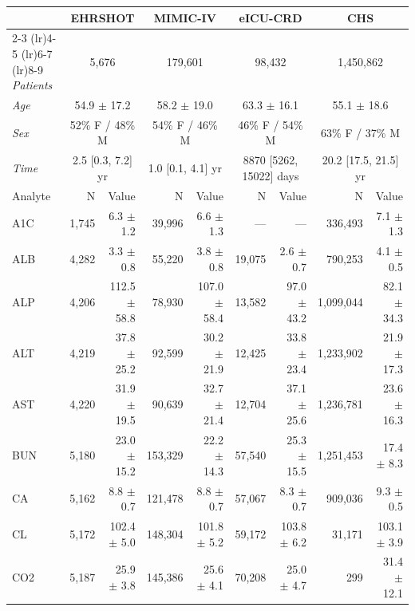 \begin{table}[ht]
\centering
\footnotesize
\begin{tabular}{lrrrrrrrr}
\toprule
  & \multicolumn{2}{c}{EHRSHOT} & \multicolumn{2}{c}{MIMIC-IV} & \multicolumn{2}{c}{eICU-CRD} & \multicolumn{2}{c}{CHS} \\
\cmidrule(lr){2-3} \cmidrule(lr){4-5} \cmidrule(lr){6-7} \cmidrule(lr){8-9}
\textit{Patients} & \multicolumn{2}{c}{5,676} & \multicolumn{2}{c}{179,601} & \multicolumn{2}{c}{98,432} & \multicolumn{2}{c}{1,450,862} \\
\textit{Age} & \multicolumn{2}{c}{54.9 $\pm$ 17.2} & \multicolumn{2}{c}{58.2 $\pm$ 19.0} & \multicolumn{2}{c}{63.3 $\pm$ 16.1} & \multicolumn{2}{c}{55.1 $\pm$ 18.6} \\
\textit{Sex} & \multicolumn{2}{c}{52\% F / 48\% M} & \multicolumn{2}{c}{54\% F / 46\% M} & \multicolumn{2}{c}{46\% F / 54\% M} & \multicolumn{2}{c}{63\% F / 37\% M} \\
\textit{Time} & \multicolumn{2}{c}{2.5 [0.3, 7.2] yr} & \multicolumn{2}{c}{1.0 [0.1, 4.1] yr} & \multicolumn{2}{c}{8870 [5262, 15022] days} & \multicolumn{2}{c}{20.2 [17.5, 21.5] yr} \\
\midrule
Analyte & N & Value & N & Value & N & Value & N & Value \\
\midrule
A1C & 1,745 & 6.3 $\pm$ 1.2 & 39,996 & 6.6 $\pm$ 1.3 & --- & --- & 336,493 & 7.1 $\pm$ 1.3 \\
ALB & 4,282 & 3.3 $\pm$ 0.8 & 55,220 & 3.8 $\pm$ 0.8 & 19,075 & 2.6 $\pm$ 0.7 & 790,253 & 4.1 $\pm$ 0.5 \\
ALP & 4,206 & 112.5 $\pm$ 58.8 & 78,930 & 107.0 $\pm$ 58.4 & 13,582 & 97.0 $\pm$ 43.2 & 1,099,044 & 82.1 $\pm$ 34.3 \\
ALT & 4,219 & 37.8 $\pm$ 25.2 & 92,599 & 30.2 $\pm$ 21.9 & 12,425 & 33.8 $\pm$ 23.4 & 1,233,902 & 21.9 $\pm$ 17.3 \\
AST & 4,220 & 31.9 $\pm$ 19.5 & 90,639 & 32.7 $\pm$ 21.4 & 12,704 & 37.1 $\pm$ 25.6 & 1,236,781 & 23.6 $\pm$ 16.3 \\
BUN & 5,180 & 23.0 $\pm$ 15.2 & 153,329 & 22.2 $\pm$ 14.3 & 57,540 & 25.3 $\pm$ 15.5 & 1,251,453 & 17.4 $\pm$ 8.3 \\
CA & 5,162 & 8.8 $\pm$ 0.7 & 121,478 & 8.8 $\pm$ 0.7 & 57,067 & 8.3 $\pm$ 0.7 & 909,036 & 9.3 $\pm$ 0.5 \\
CL & 5,172 & 102.4 $\pm$ 5.0 & 148,304 & 101.8 $\pm$ 5.2 & 59,172 & 103.8 $\pm$ 6.2 & 31,171 & 103.1 $\pm$ 3.9 \\
CO2 & 5,187 & 25.9 $\pm$ 3.8 & 145,386 & 25.6 $\pm$ 4.1 & 70,208 & 25.0 $\pm$ 4.7 & 299 & 31.4 $\pm$ 12.1 \\

\end{tabular}
\end{table}
